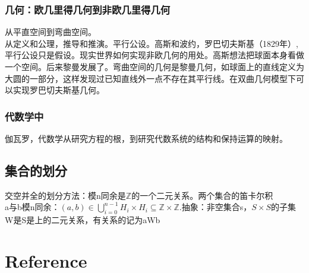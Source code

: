 \documentclass[UTF8]{../09-Mathematics}
\begin{document}
\subsubsection{几何：欧几里得几何到非欧几里得几何}
从平直空间到弯曲空间。\\
从定义和公理，推导和推演。平行公设。高斯和波约，罗巴切夫斯基（1829年）,平行公设只是假设。现实世界如何实现非欧几何的用处。高斯想法把球面本身看做一个空间。后来黎曼发展了。弯曲空间的几何是黎曼几何，如球面上的直线定义为大圆的一部分，这样发现过已知直线外一点不存在其平行线。在双曲几何模型下可以实现罗巴切夫斯基几何。\\
\subsubsection{代数学中}
伽瓦罗，代数学从研究方程的根，到研究代数系统的结构和保持运算的映射。

\subsection{集合的划分}
交空并全的划分方法：模n同余是$\mathbb Z$的一个二元关系。两个集合的笛卡尔积\\
a与b模n同余：$(a,b) \in \bigcup _{i=0}^{n-1} H_i \times H_i \subseteq \mathbb Z \times \mathbb Z$.抽象：非空集合s，$S\times S$的子集W是S是上的二元关系，有关系的记为aWb\\





\section{Reference}
\end{document}

